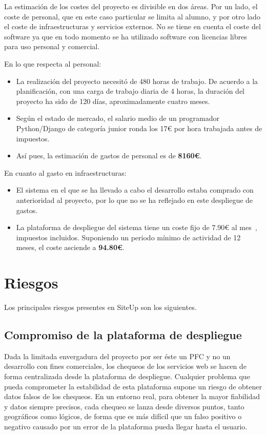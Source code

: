 La estimación de los costes del proyecto es divisible en dos áreas. Por un lado,
el coste de personal, que en este caso particular se limita al alumno, y por
otro lado el coste de infraestructuras y servicios externos. No se tiene en
cuenta el coste del software ya que en todo momento se ha utilizado software con
licencias libres para uso personal y comercial.

En lo que respecta al personal:

\begin{itemize}
\item La realización del proyecto necesitó de 480 horas de trabajo. De acuerdo a
  la planificación, con una carga de trabajo diaria de 4 horas, la duración del
  proyecto ha sido de 120 días, aproximadamente cuatro meses.
\item Según el estado de mercado, el salario medio de un programador
  Python/Django de categoría junior ronda los 17€ por hora trabajada antes de
  impuestos.
\item Así pues, la estimación de gastos de personal es de \textbf{8160€}.
\end{itemize}

En cuanto al gasto en infraestructuras:

\begin{itemize}
\item El sistema en el que se ha llevado a cabo el desarrollo estaba comprado
  con anterioridad al proyecto, por lo que no se ha reflejado en este despliegue
  de gastos.

\item La plataforma de despliegue del sistema tiene un coste fijo de 7.90€ al
  mes~\cite{hetznervq7}, impuestos incluidos. Suponiendo un periodo mínimo de
  actividad de 12 meses, el coste asciende a \textbf{94.80€}.
\end{itemize}

\section{Riesgos}

Los principales riesgos presentes en SiteUp son los siguientes.

\subsection{Compromiso de la plataforma de despliegue}

Dada la limitada envergadura del proyecto por ser éste un PFC y no un desarrollo
con fines comerciales, los chequeos de los servicios web se hacen de forma
centralizada desde la plataforma de despliegue. Cualquier problema que pueda
comprometer la estabilidad de esta plataforma supone un riesgo de obtener datos
falsos de los chequeos. En un entorno real, para obtener la mayor fiabilidad y
datos siempre precisos, cada chequeo se lanza desde diversos puntos, tanto
geográficos como lógicos, de forma que es más difícil que un falso positivo o
negativo causado por un error de la plataforma pueda llegar hasta el usuario.

